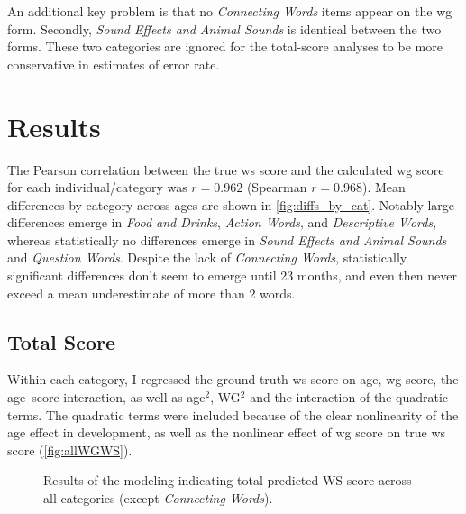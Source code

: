 \documentclass[letterpaper]{article}
\newcommand{\sounds}{\textit{Sound Effects and Animal Sounds}}
\newcommand{\cwords}{\textit{Connecting Words}}
\newcommand{\food}{\textit{Food and Drinks}}
\begin{document}
    An additional key problem is that no \cwords{} items appear on the \gls{wg}
    form. Secondly, \sounds{} is identical between the two forms. These two categories are
    ignored for the total-score analyses to be more conservative in estimates of error rate.

    \section{Results}

    The Pearson correlation between the true \gls{ws} score and the calculated
    \gls{wg} score for each individual/category was $r=0.962$ (Spearman $r=0.968$).
    Mean differences
    by category across ages are shown in \autoref{fig:diffs_by_cat}. Notably
    large differences emerge in \food{}, \textit{Action Words},
    and \textit{Descriptive Words}, whereas statistically no differences emerge
    in \sounds{} and \textit{Question Words}. Despite the lack of \cwords{},
    statistically significant differences don't seem to emerge until 23 months, and
    even then never exceed a mean underestimate of more than 2 words.

    \subsection{Total Score}

    Within each
    category, I regressed the ground-truth \gls{ws} score on age,
    \gls{wg} score, the
    age--score interaction, as well as age$^2$, WG$^2$ and the interaction of
    the quadratic terms. The quadratic terms were included because of the
    clear nonlinearity of the age effect in development, as well as the
    nonlinear effect of \gls{wg} score on true \gls{ws} score
    (\autoref{fig:allWGWS}).


    \begin{figure}
        \centering


        \caption{Results of the modeling indicating total predicted WS score
                    across all categories (except \cwords{}).}
        \label{fig:error}

    \end{figure}
\end{document}
